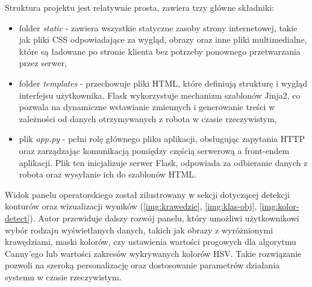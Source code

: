 Struktura projektu jest relatywnie prosta, zawiera trzy główne składniki:
\begin{itemize}
  \item folder \textit{static} - zawiera wszystkie statyczne zasoby strony internetowej, takie jak pliki CSS odpowiadające za wygląd, obrazy oraz inne pliki multimedialne, które są ładowane po stronie klienta bez potrzeby ponownego przetwarzania przez serwer,
  \item folder \textit{templates} - przechowuje pliki HTML, które definiują strukturę i wygląd interfejsu użytkownika. Flask wykorzystuje mechanizm szablonów Jinja2, co pozwala na dynamiczne wstawianie zmiennych i generowanie treści w zależności od danych otrzymywanych z robota w czasie rzeczywistym,
  \item plik \textit{app.py} -  pełni rolę głównego pliku aplikacji, obsługując zapytania HTTP oraz zarządzając komunikacją pomiędzy częścią serwerową a front-endem aplikacji. Plik ten inicjalizuje serwer Flask, odpowiada za odbieranie danych z robota oraz wysyłanie ich do szablonów HTML.
\end{itemize} 


Widok panelu operatorskiego został zilustrowany w sekcji dotyczącej detekcji konturów oraz wizualizacji wyników (\ref{img:krawedzie}, \ref{img:klas-obj}, \ref{img:kolor-detect}). Autor przewiduje dalszy rozwój panelu, który umożliwi użytkownikowi wybór rodzaju wyświetlanych danych, takich jak obrazy z wyróżnionymi krawędziami, maski kolorów, czy ustawienia wartości progowych dla algorytmu Canny’ego lub wartości zakresów wykrywanych kolorów HSV. Takie rozwiązanie pozwoli na szeroką personalizację oraz dostosowanie parametrów działania systemu w czasie rzeczywistym.





